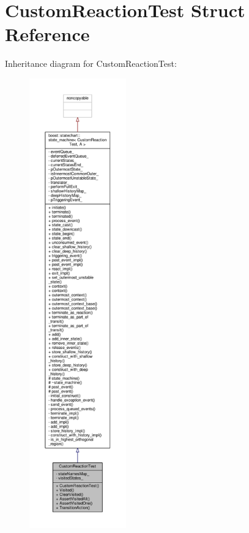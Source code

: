 \hypertarget{struct_custom_reaction_test}{}\section{Custom\+Reaction\+Test Struct Reference}
\label{struct_custom_reaction_test}


Inheritance diagram for Custom\+Reaction\+Test\+:
\nopagebreak
\begin{figure}[H]
\begin{center}
\leavevmode
\includegraphics[height=550pt]{struct_custom_reaction_test__inherit__graph}
\end{center}
\end{figure}


